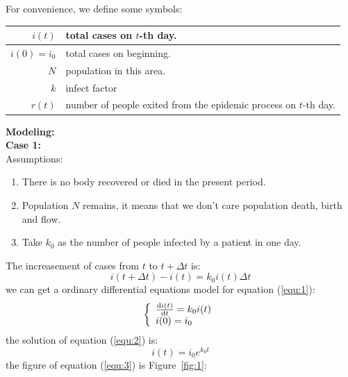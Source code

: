 For convenience, we define some symbols:
\begin{center}
\begin{tabular}{|r|p{7cm}|}
\hline
$ i(t) $ & total cases on $t$-th day.\\
\hline
$ i(0)=i_0 $ & total cases on beginning.\\
\hline
$ N $ & population in this area.\\
\hline
$ k $ & infect factor\\
\hline
$ r(t) $ & number of people exited from the epidemic process on
$t$-th day.\\
\hline
\end{tabular}
\end{center}%
\textbf{\large Modeling:}\\
\textbf{Case 1:}\\
Assumptions:
\begin{enumerate}
  \item There is no body recovered or died in the present period.
  \item Population $ N $ remains, it means
  that we don't care population death, birth and flow.
  \item Take $ k_0 $ as the number of people infected by
a patient in one day.
\end{enumerate}
The increasement of cases from $ t $ to $ t+\Delta t$ is:
\begin{equation}
i(t+\Delta{t})-i(t)=k_0i(t)\Delta{t}
\label{equ:1}
\end{equation}
we can get a ordinary differential equations model for 
equation (\ref{equ:1}):
\begin{equation}
\left\{
\begin{array}{l}
\frac{{\mathrm{d}}i(t)}{{\mathrm{d}}t}=k_0i(t)\\
i(0)=i_0
\end{array}\right.
\label{equ:2}
\end{equation}
the solution of equation (\ref{equ:2}) is:
\begin{equation}
i(t)=i_0e^{k_0t}
\label{equ:3}
\end{equation}
the figure of equation (\ref{equ:3}) is Figure~\ref{fig:1}:\par
